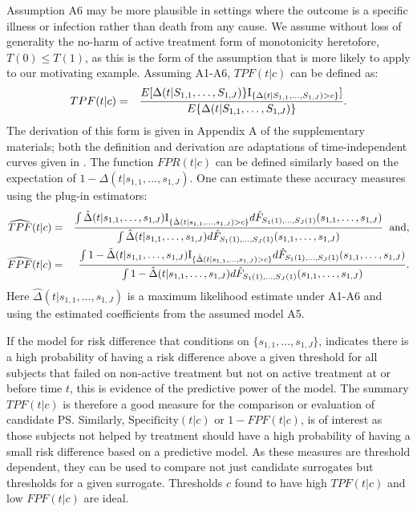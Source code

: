 \documentclass[times, doublespace]{simauth}
\begin{document}
Assumption A6 may be more plausible in settings where the outcome is a specific illness or infection rather than death from any cause. We assume without loss of generality the no-harm of active treatment form of monotonicity heretofore, $T(0) \leq T(1)$, as this is the form of the assumption that is more likely to apply to our motivating example. Assuming A1-A6, $TPF(t|c)$ can be defined as:
\begin{eqnarray*}
TPF(t|c)&=&{E[\Delta(t|S_{1,1}, \dots, S_{1,J})\}\mathrm{I}_{\{\Delta(t|S_{1,1}, \dots, S_{1,J})>c\}}] \over E\{\Delta(t|S_{1,1}, \dots, S_{1,J})\}}.
\end{eqnarray*}
The derivation of this form is given in Appendix A of the supplementary materials; both the definition and derivation are adaptations of time-independent curves given in \citet{Huang12b}. The function $FPR(t|c)$ can be defined similarly based on the expectation of $1-\Delta(t|s_{1,1}, \dots, s_{1,J})$. One can estimate these accuracy measures using the plug-in estimators:
\begin{eqnarray*}
\widehat{TPF}(t|c)&=& {\int \hat{\Delta}(t|s_{1,1}, \dots, s_{1,J})\mathrm{I}_{\{\hat{\Delta}(t|s_{1,1}, \dots, s_{1,J})>c\}}d\hat{F}_{S_1(1), \ldots, S_J(1)}(s_{1,1}, \dots, s_{1,J}) \over \int \hat{\Delta}(t|s_{1,1}, \dots, s_{1,J})d\hat{F}_{S_1(1), \ldots, S_J(1)}(s_{1,1}, \dots, s_{1,J})} \hspace{2mm}\mbox{and},\\
\widehat{FPF}(t|c)&=& {\int 1-\hat{\Delta}(t|s_{1,1}, \dots, s_{1,J})\mathrm{I}_{\{\hat{\Delta}(t|s_{1,1}, \dots, s_{1,J})>c\}}d\hat{F}_{S_1(1), \ldots, S_J(1)}(s_{1,1}, \dots, s_{1,J}) \over \int 1-\hat{\Delta}(t|s_{1,1}, \dots, s_{1,J})d\hat{F}_{S_1(1), \ldots, S_J(1)}(s_{1,1}, \dots, s_{1,J})}.\\
\end{eqnarray*}
Here $\hat{\Delta}(t|s_{1,1}, \dots, s_{1,J})$ is a maximum likelihood estimate under A1-A6 and using the estimated coefficients from the assumed model A5. 

If the model for risk difference that conditions on $\{s_{1,1}, \ldots, s_{1,J}\}$, indicates there is a high probability of having a risk difference above a given threshold for all subjects that failed on non-active treatment but not on active treatment at or before time $t$, this is evidence of the predictive power of the model. The summary $TPF(t|c)$ is therefore a good measure for the comparison or evaluation of candidate PS. Similarly, $\mbox{Specificity}(t|c)$ or $1-FPF(t|c)$, is of interest as those subjects not helped by treatment should have a high probability of having a small risk difference based on a predictive model. As these measures are threshold dependent, they can be used to compare not just candidate surrogates but thresholds for a given surrogate. Thresholds $c$ found to have high $TPF(t|c)$ and low $FPF(t|c)$ are ideal. 
\end{document}
